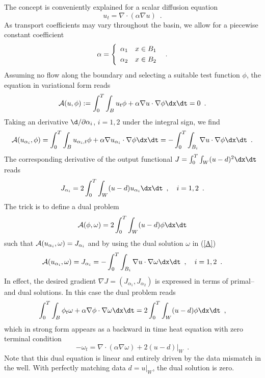 The concept is conveniently explained for a scalar diffusion equation 
$$
 u_t = \nabla \cdot (\alpha \nabla u) \enspace .
$$
As transport coefficients may vary throughout the basin,
we allow for a piecewise constant coefficient 
$$
 \alpha = \left\{
 \begin{array}{rl} \alpha_1 & x \in B_1 \\[\jot] \alpha_2 & x \in B_2 \end{array}
 \right .
 \enspace .
$$
Assuming no flow along the boundary and
selecting a suitable test function $\phi$, the equation in variational form reads
$$
  {\cal A}(u, \phi) := \int_0^T \int_B u_t \phi + \alpha \nabla u \cdot \nabla \phi \dx \dt = 0 \enspace .
$$
Taking an derivative $\d/\partial \alpha_i$, $i=1,2$ under the integral sign, we find
\begin{equation} \label{A}
 {\cal A}(u_{\alpha_i}, \phi) = 
 \int_0^T \int_B u_{\alpha_i,t} \phi + \alpha \nabla u_{\alpha_i} \cdot \nabla \phi \dx \dt =
 - \int_0^T \int_{B_i} \nabla u \cdot \nabla \phi \dx \dt
 \enspace .
\end{equation}
The corresponding derivative of the output functional 
$J=\int_0^T \int_W (u-d)^2 \dx\dt$ reads 
$$
 J_{\alpha_i} = 2 \int_0^T \int_W (u - d) u_{\alpha_i} \dx\dt \enspace , \quad i=1,2 \enspace .
$$
The trick is to define a dual problem 
$$
 {\cal A}(\phi, \omega) = 2 \int_0^T \int_W (u - d) \phi \dx\dt
$$
such that ${\cal A}(u_{\alpha_i}, \omega) =  J_{\alpha_i}$ and by using the dual solution $\omega$ in (\ref{A})
$$
 {\cal A}(u_{\alpha_i}, \omega) =  J_{\alpha_i} = - \int_0^T \int_{B_i} \nabla u \cdot \nabla \omega \dx \dt \enspace , 
 \quad i=1,2 \enspace .
$$
In effect, the desired gradient $\nabla J = (J_{\alpha_1}, J_{\alpha_2})$ is expressed in terms of primal-- and dual solutions.
In this case the dual problem reads
$$
 \int_0^T \int_B \phi_t \omega + \alpha \nabla \phi \cdot \nabla \omega \dx \dt =
 2 \int_0^T \int_W (u-d) \phi \dx \dt \enspace ,
$$
which in strong form appears as a backward in time heat equation with zero terminal condition
\begin{equation} \label{dual}
 - \omega_t = \nabla \cdot (\alpha \nabla \omega) + 2 (u-d)|_W \enspace .
\end{equation}
Note that this dual equation is linear and entirely driven by the data mismatch in the well.
With perfectly matching data $d=u|_W$, the dual solution is zero. 

